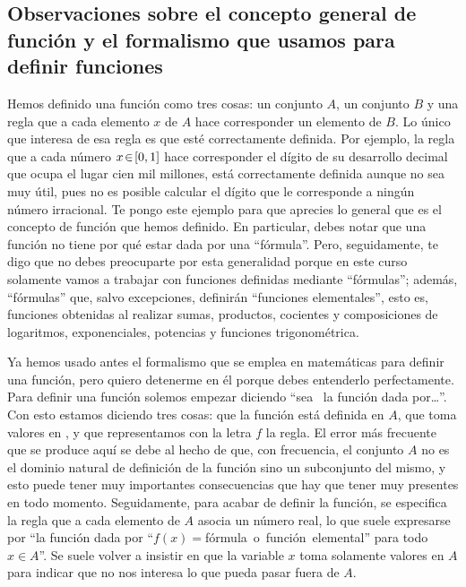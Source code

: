\subsection*{Observaciones sobre el concepto general de función y el formalismo
que usamos para definir funciones}

Hemos definido una función como tres cosas: un conjunto $A$, un conjunto
$B$ y una regla que a cada elemento $x$ de $A$ hace corresponder
un elemento de $B$. Lo único que interesa de esa regla es que esté
correctamente definida. Por ejemplo, la regla que a cada número $x\!\in\![0,1]$
hace corresponder el dígito de su desarrollo decimal que ocupa el
lugar cien mil millones, está correctamente definida aunque no sea
muy útil, pues no es posible calcular el dígito que le corresponde
a ningún número irracional. Te pongo este ejemplo para que aprecies
lo general que es el concepto de función que hemos definido. En particular,
debes notar que una función no tiene por qué estar dada por una ``fórmula''.
Pero, seguidamente, te digo que no debes preocuparte por esta generalidad
porque en este curso solamente vamos a trabajar con funciones definidas
mediante ``fórmulas''; además, ``fórmulas'' que, salvo excepciones,
definirán ``funciones elementales'', esto es, funciones obtenidas
al realizar sumas, productos, cocientes y composiciones de logaritmos,
exponenciales, potencias y funciones trigonométrica.

Ya hemos usado antes el formalismo que se emplea en matemáticas para
definir una función, pero quiero detenerme en él porque debes entenderlo
perfectamente. Para definir una función solemos empezar diciendo ``sea
\ la función dada por…''. Con esto estamos diciendo
tres cosas: que la función está definida en $A$, que toma valores
en \R, y que representamos con la letra $f$ la regla. El error más
frecuente que se produce aquí se debe al hecho de que, con frecuencia,
el conjunto $A$ no es el dominio natural de definición de la función
sino un subconjunto del mismo, y esto puede tener muy importantes
consecuencias que hay que tener muy presentes en todo momento. Seguidamente,
para acabar de definir la función, se especifica la regla que a cada
elemento de $A$ asocia un número real, lo que suele expresarse por
``la función dada por ``$f(x)=$fórmula\ o\ función\ elemental''
para todo $x\in A$''. Se suele volver a insistir en que la variable
$x$ toma solamente valores en $A$ para indicar que no nos interesa
lo que pueda pasar fuera de $A$.

